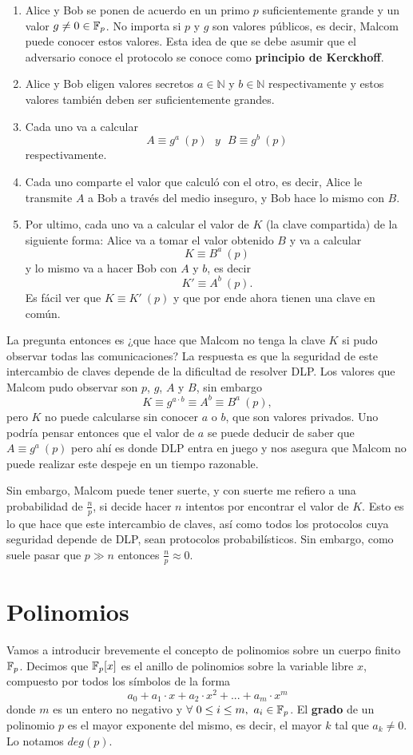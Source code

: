 \begin{enumerate}
    \item Alice y Bob se ponen de acuerdo en un primo $p$ suficientemente grande y un valor $g \neq 0 \in \mathbb{F}_p$. No importa si $p$ y $g$ son valores públicos, es decir, Malcom puede conocer estos valores. Esta idea de que se debe asumir que el adversario conoce el protocolo se conoce como \textbf{principio de Kerckhoff}.
    \item Alice y Bob eligen valores secretos $a \in \mathbb{N}$ y $b \in \mathbb{N}$ respectivamente y estos valores también deben ser suficientemente grandes.
    \item Cada uno va a calcular $$A \equiv g^a ~(p)~~~y~~~ B \equiv g^b ~(p)$$ respectivamente.  
    \item Cada uno comparte el valor que calculó con el otro, es decir, Alice le transmite $A$ a Bob a través del medio inseguro, y Bob hace lo mismo con $B$.
    \item Por ultimo, cada uno va a calcular el valor de $K$ (la clave compartida) de la siguiente forma: Alice va a tomar el valor obtenido $B$ y va a calcular $$K \equiv B^a ~ (p)$$ y lo mismo va a hacer Bob con $A$ y $b$, es decir $$K' \equiv A^b ~ (p).$$ Es fácil ver que $K \equiv K' ~ (p)$ y que por ende ahora tienen una clave en común.
\end{enumerate}

La pregunta entonces es ¿que hace que Malcom no tenga la clave $K$ si pudo observar todas las comunicaciones? La respuesta es que la seguridad de este intercambio de claves depende de la dificultad de resolver DLP. Los valores que Malcom pudo observar son $p$, $g$, $A$ y $B$, sin embargo $$K \equiv g^{a\cdot b} \equiv A^b \equiv B^a ~ (p),$$ pero $K$ no puede calcularse sin conocer $a$ o $b$, que son valores privados. Uno podría pensar entonces que el valor de $a$ se puede deducir de saber que $A \equiv g^a~(p)$ pero ahí es donde DLP entra en juego y nos asegura que Malcom no puede realizar este despeje en un tiempo razonable. 

Sin embargo, Malcom puede tener suerte, y con suerte me refiero a una probabilidad de $\frac{n}{p}$, si decide hacer $n$ intentos por encontrar el valor de $K$. Esto es lo que hace que este intercambio de claves, así como todos los protocolos cuya seguridad depende de DLP, sean protocolos probabilísticos. Sin embargo, como suele pasar que $p \gg n$ entonces $\frac{n}{p} \approx 0$. 

\section{Polinomios} \label{sec:polinomios}
Vamos a introducir brevemente el concepto de polinomios sobre un cuerpo finito $\mathbb{F}_p$. Decimos que $\mathbb{F}_p[x]$ es el anillo de polinomios sobre la variable libre $x$, compuesto por todos los símbolos de la forma $$a_0+a_1\cdot x + a_2 \cdot x^2 + ... + a_m \cdot x^m$$ donde $m$ es un entero no negativo y $\forall ~ 0\leq i \leq m, ~a_i \in \mathbb{F}_p$. El \textbf{grado} de un polinomio $p$ es el mayor exponente del mismo, es decir, el mayor $k$ tal que $a_k \neq 0$. Lo notamos $deg(p)$.


